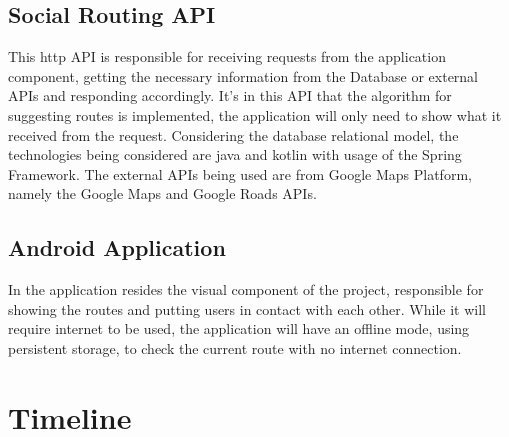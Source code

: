 \documentclass{article}
\begin{document}
        \subsection{Social Routing API}
            This http API is responsible for receiving requests from the application component, getting the necessary information from the Database or external APIs
            and responding accordingly. It's in this API that the algorithm for suggesting routes is implemented, the application will only need to show what it
            received from the request.
            Considering the database relational model, the technologies being considered are java and kotlin with usage of the Spring Framework. 
            The external APIs being used are from Google Maps Platform, namely the Google Maps and Google Roads APIs.  

        \subsection{Android Application}
            In the application resides the visual component of the project, responsible for showing the routes and putting users in contact with each other.
            While it will require internet to be used, the application will have an offline mode, using persistent storage, to check the current route with no internet connection.

    \section{Timeline}   
\end{document}
